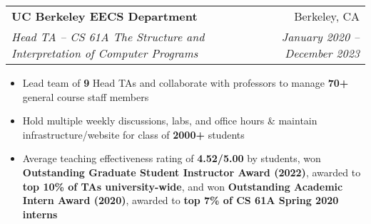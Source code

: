 \documentclass[letterpaper,11pt]{article}
\makeatletter
\newcommand{\resumeItem}[1]{
  \item\small{
    {#1 \vspace{-4pt}}
  }
}
\newcommand{\resumeSubheading}[4]{
  \vspace{-2pt}\item
    \begin{tabular*}{0.97\textwidth}[t]{l@{\extracolsep{\fill}}r}
      \textbf{#1} & #2 \\
      \textit{\small#3} & \textit{\small #4} \\
    \end{tabular*}\vspace{-8pt}
}
\newcommand{\resumeSubSubheading}[2]{
    \item
    \begin{tabular*}{0.97\textwidth}{l@{\extracolsep{\fill}}r}
      \textit{\small#1} & \textit{\small #2} \\
    \end{tabular*}\vspace{-8pt}
}
\newcommand{\resumeItemListStart}{\begin{itemize}[leftmargin=0.2in]}
\newcommand{\resumeItemListEnd}{\end{itemize}\vspace{-5pt}}
\makeatother
\begin{document}
\resumeSubheading
    {UC Berkeley EECS Department}{Berkeley, CA}{Head TA – CS 61A The Structure and Interpretation of Computer Programs}{January 2020 – December 2023}
    \resumeItemListStart
        \resumeItem{Lead team of \textbf{9} Head TAs and collaborate with professors to manage \textbf{70+} general course staff members}
        \resumeItem{Hold multiple weekly discussions, labs, and office hours \& maintain infrastructure/website for class of \textbf{2000+} students}
        \resumeItem{Average teaching effectiveness rating of \textbf{4.52/5.00} by students, won \textbf{Outstanding Graduate Student Instructor Award (2022)}, awarded to \textbf{top 10\% of TAs university-wide}, and won \textbf{Outstanding Academic Intern Award (2020)}, awarded to \textbf{top 7\% of CS 61A Spring 2020 interns}}
    \resumeItemListEnd

    
\end{document}
